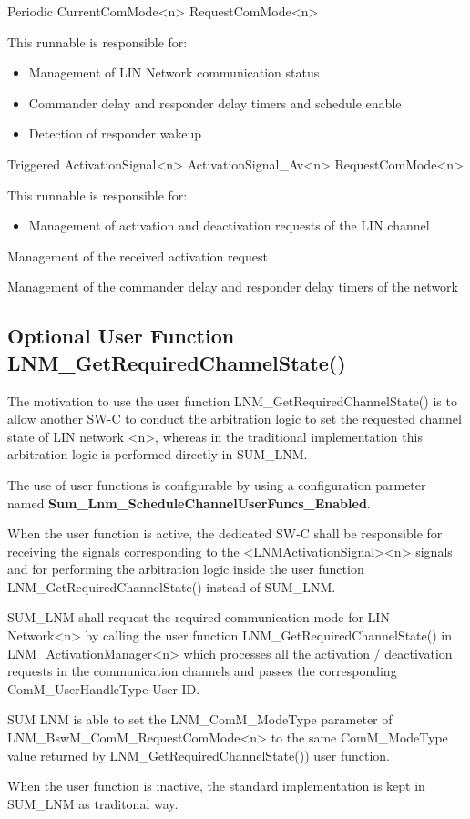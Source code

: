{Periodic}
{}
{CurrentComMode<n>}
{RequestComMode<n>}
{}
{}
{This runnable is responsible for:
\begin{itemize}
\item Management of LIN Network communication status
\item Commander delay and responder delay timers and schedule enable
\item Detection of responder wakeup
\end{itemize}
}

{Triggered}
{}
{ActivationSignal<n> \newline
ActivationSignal_Av<n>}
{RequestComMode<n>}
{}
{}
{This runnable is responsible for:
\begin{itemize}
\item Management of activation and deactivation requests of the LIN channel
\end{itemize}
}

{}
{}
{}
{}
{Management of the received activation request}

{}
{}
{}
{}
{Management of the commander delay and responder delay timers of the network}

\subsection{Optional User Function LNM_GetRequiredChannelState()}
\label{subsec:usrfunc_network}
{
The motivation to use the user function LNM_GetRequiredChannelState() is to allow another SW-C to conduct the arbitration logic to set the requested channel state of LIN network <n>, whereas in the traditional implementation this arbitration logic is performed directly in SUM_LNM.

The use of user functions is configurable by using a configuration parmeter named  \textbf{Sum_Lnm_ScheduleChannelUserFuncs_Enabled}.

When the user function is active, the dedicated SW-C shall be responsible for receiving the signals corresponding to the <LNMActivationSignal><n> signals and for performing the arbitration logic inside the user function LNM_GetRequiredChannelState() instead of SUM_LNM.

SUM_LNM shall request the required communication mode for LIN Network<n> by calling the user function LNM_GetRequiredChannelState() in LNM_ActivationManager<n> which processes all the activation / deactivation requests in the communication channels and passes the corresponding ComM_UserHandleType User ID.

SUM LNM is able to set the LNM_ComM_ModeType parameter of LNM_BswM_ComM_RequestComMode<n> to the same ComM_ModeType value returned by LNM_GetRequiredChannelState()) user function.

When the user function is inactive, the standard implementation is kept in SUM_LNM as traditonal way.
}
{}

